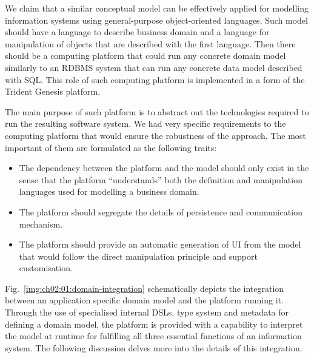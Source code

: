  We claim that a similar conceptual model can be effectively applied for modelling information systems using general-purpose object-oriented languages.
  Such model should have a language to describe business domain and a language for manipulation of objects that are described with the first language.
  Then there should be a computing platform that could run any concrete domain model similarly to an RDBMS system that can run any concrete data model described with SQL.
  This role of such computing platform is implemented in a form of the Trident Genesis platform.
  
  The main purpose of such platform is to abstract out the technologies required to run the resulting software system.
  We had very specific requirements to the computing platform that would ensure the robustness of the approach.
  The most important of them are formulated as the following traits:
  \begin{itemize}
    \item The dependency between the platform and the model should only exist in the sense that the platform ``understands'' both the definition and manipulation languages used for modelling a business domain.
    \item The platform should segregate the details of persistence and communication mechanism.
    \item The platform should provide an automatic generation of UI from the model that would follow the direct manipulation principle and support customisation.
  \end{itemize}

  Fig.~\ref{img:ch02:01:domain-integration} schematically depicts the integration between an application specific domain model and the platform running it.
  Through the use of specialised internal DSLs, type system and metadata for defining a domain model, the platform is provided with a capability to interpret the model at runtime for fulfilling all three essential functions of an information system. 
  The following discussion delves more into the details of this integration.

